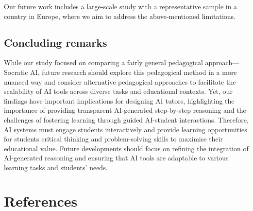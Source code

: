 \documentclass[
  12pt,
]{article}
\begin{document}
Our future work includes a large-scale study with a representative sample in a country in Europe, where we aim to address the above-mentioned limitations.

\subsection{Concluding remarks}\label{concluding-remarks}

While our study focused on comparing a fairly general pedagogical approach---Socratic AI, future research should explore this pedagogical method in a more nuanced way and consider alternative pedagogical approaches to facilitate the scalability of AI tools across diverse tasks and educational contexts. Yet, our findings have important implications for designing AI tutors, highlighting the importance of providing transparent AI-generated step-by-step reasoning and the challenges of fostering learning through guided AI-student interactions. Therefore, AI systems must engage students interactively and provide learning opportunities for students critical thinking and problem-solving skills to maximise their educational value. Future developments should focus on refining the integration of AI-generated reasoning and ensuring that AI tools are adaptable to various learning tasks and students' needs.

\section*{References}\label{references}
\end{document}
